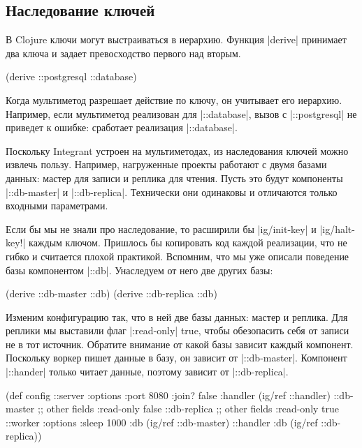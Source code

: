 \subsection{Наследование ключей}

В Clojure ключи могут выстраиваться в иерархию. Функция \spverb|derive| принимает два
ключа и задает превосходство первого над вторым.

\begin{code}
(derive ::postgresql ::database)
\end{code}

Когда мультиметод разрешает действие по ключу, он учитывает его
иерархию. Например, если мультиметод реализован для \spverb|::database|, вызов с
\spverb|::postgresql| не приведет к ошибке: сработает реализация \spverb|::database|.

Поскольку Integrant устроен на мультиметодах, из наследования ключей можно
извлечь пользу. Например, нагруженные проекты работают с двумя базами данных:
мастер для записи и реплика для чтения. Пусть это будут компоненты \spverb|::db-master|
и \spverb|::db-replica|. Технически они одинаковы и отличаются только входными
параметрами.

Если бы мы не знали про наследование, то расширили бы \spverb|ig/init-key| и
\spverb|ig/halt-key!| каждым ключом. Пришлось бы копировать код каждой реализации, что
не гибко и считается плохой практикой. Вспомним, что мы уже описали поведение
базы компонентом \spverb|::db|. Унаследуем от него две других базы:

\begin{code}
(derive ::db-master ::db)
(derive ::db-replica ::db)
\end{code}

Изменим конфигурацию так, что в ней две базы данных: мастер и реплика. Для
реплики мы выставили флаг \spverb|:read-only| true, чтобы обезопасить себя от записи не
в тот источник. Обратите внимание от какой базы зависит каждый
компонент. Поскольку воркер пишет данные в базу, он зависит от
\spverb|::db-master|. Компонент \spverb|::hander| только читает данные, поэтому зависит от
\spverb|::db-replica|.

\begin{code}
(def config
  {::server {:options {:port 8080 :join? false}
             :handler (ig/ref ::handler)}
   ::db-master {;; other fields
                :read-only false}
   ::db-replica {;; other fields
                 :read-only true}
   ::worker {:options {:sleep 1000}
             :db (ig/ref ::db-master)}
   ::handler {:db (ig/ref ::db-replica)}})
\end{code}

